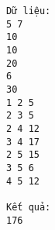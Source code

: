 \begin{verbatim}
Dữ liệu:
5 7
10
10
20
6
30
1 2 5
2 3 5
2 4 12
3 4 17
2 5 15
3 5 6
4 5 12

Kết quả:
176
\end{verbatim}